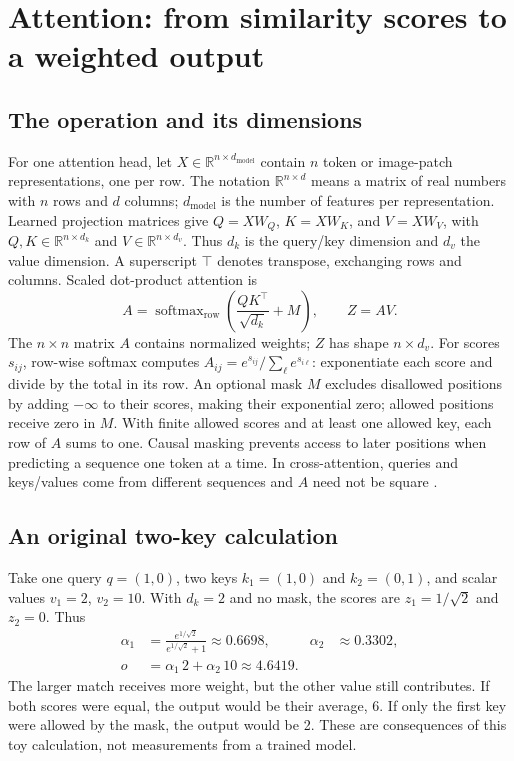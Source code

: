 \appendix
\section{Attention: from similarity scores to a weighted output}\label{app:attention}
\subsection{The operation and its dimensions}
For one attention head, let $X\in\mathbb{R}^{n\times d_{\mathrm{model}}}$ contain $n$ token or image-patch representations, one per row. The notation $\mathbb{R}^{n\times d}$ means a matrix of real numbers with $n$ rows and $d$ columns; $d_{\mathrm{model}}$ is the number of features per representation. Learned projection matrices give $Q=XW_Q$, $K=XW_K$, and $V=XW_V$, with $Q,K\in\mathbb{R}^{n\times d_k}$ and $V\in\mathbb{R}^{n\times d_v}$. Thus $d_k$ is the query/key dimension and $d_v$ the value dimension. A superscript $\top$ denotes transpose, exchanging rows and columns. Scaled dot-product attention is
\begin{equation}\label{eq:attention}
 A=\operatorname{softmax}_{\mathrm{row}}\!\left(\frac{QK^\top}{\sqrt{d_k}}+M\right),
 \qquad Z=AV.
\end{equation}
The $n\times n$ matrix $A$ contains normalized weights; $Z$ has shape $n\times d_v$. For scores $s_{ij}$, row-wise softmax computes $A_{ij}=e^{s_{ij}}/\sum_\ell e^{s_{i\ell}}$: exponentiate each score and divide by the total in its row. An optional mask $M$ excludes disallowed positions by adding $-\infty$ to their scores, making their exponential zero; allowed positions receive zero in $M$. With finite allowed scores and at least one allowed key, each row of $A$ sums to one. Causal masking prevents access to later positions when predicting a sequence one token at a time. In cross-attention, queries and keys/values come from different sequences and $A$ need not be square \citep{vaswani2017}.

\subsection{An original two-key calculation}
Take one query $q=(1,0)$, two keys $k_1=(1,0)$ and $k_2=(0,1)$, and scalar values $v_1=2$, $v_2=10$. With $d_k=2$ and no mask, the scores are $z_1=1/\sqrt{2}$ and $z_2=0$. Thus
\begin{align}
\alpha_1&=\frac{e^{1/\sqrt{2}}}{e^{1/\sqrt{2}}+1}\approx0.6698,
&\alpha_2&\approx0.3302,\\
o&=\alpha_1\,2+\alpha_2\,10\approx4.6419.
\end{align}
The larger match receives more weight, but the other value still contributes. If both scores were equal, the output would be their average, 6. If only the first key were allowed by the mask, the output would be 2. These are consequences of this toy calculation, not measurements from a trained model.

